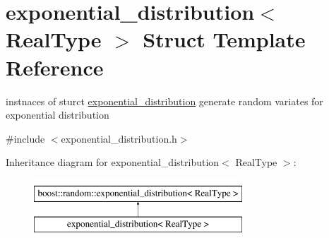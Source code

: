 \hypertarget{structexponential__distribution}{}\section{exponential\+\_\+distribution$<$ Real\+Type $>$ Struct Template Reference}
\label{structexponential__distribution}


instnaces of sturct \mbox{\hyperlink{structexponential__distribution}{exponential\+\_\+distribution}} generate random variates for exponential distribution  




{\ttfamily \#include $<$exponential\+\_\+distribution.\+h$>$}

Inheritance diagram for exponential\+\_\+distribution$<$ Real\+Type $>$\+:\begin{figure}[H]
\begin{center}
\leavevmode
\includegraphics[height=2.000000cm]{structexponential__distribution}
\end{center}
\end{figure}
